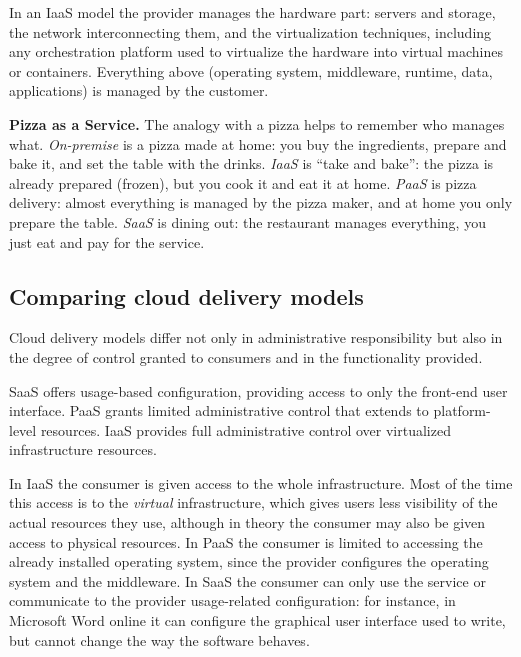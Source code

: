 In an IaaS model the provider manages the hardware part: servers and storage, the network interconnecting them, and the virtualization techniques, including any orchestration platform used to virtualize the hardware into virtual machines or containers. Everything above (operating system, middleware, runtime, data, applications) is managed by the customer.


\begin{center}
\end{center}

\begin{notebox}
	\textbf{Pizza as a Service.} The analogy with a pizza helps to remember who manages what. \emph{On-premise} is a pizza made at home: you buy the ingredients, prepare and bake it, and set the table with the drinks. \emph{IaaS} is ``take and bake'': the pizza is already prepared (frozen), but you cook it and eat it at home. \emph{PaaS} is pizza delivery: almost everything is managed by the pizza maker, and at home you only prepare the table. \emph{SaaS} is dining out: the restaurant manages everything, you just eat and pay for the service.
\end{notebox}

\begin{center}
\end{center}


\subsection{Comparing cloud delivery models}

Cloud delivery models differ not only in administrative responsibility but also in the degree of control granted to consumers and in the functionality provided.

SaaS offers usage-based configuration, providing access to only the front-end user interface. PaaS grants limited administrative control that extends to platform-level resources. IaaS provides full administrative control over virtualized infrastructure resources.

In IaaS the consumer is given access to the whole infrastructure. Most of the time this access is to the \emph{virtual} infrastructure, which gives users less visibility of the actual resources they use, although in theory the consumer may also be given access to physical resources. In PaaS the consumer is limited to accessing the already installed operating system, since the provider configures the operating system and the middleware. In SaaS the consumer can only use the service or communicate to the provider usage-related configuration: for instance, in Microsoft Word online it can configure the graphical user interface used to write, but cannot change the way the software behaves.

